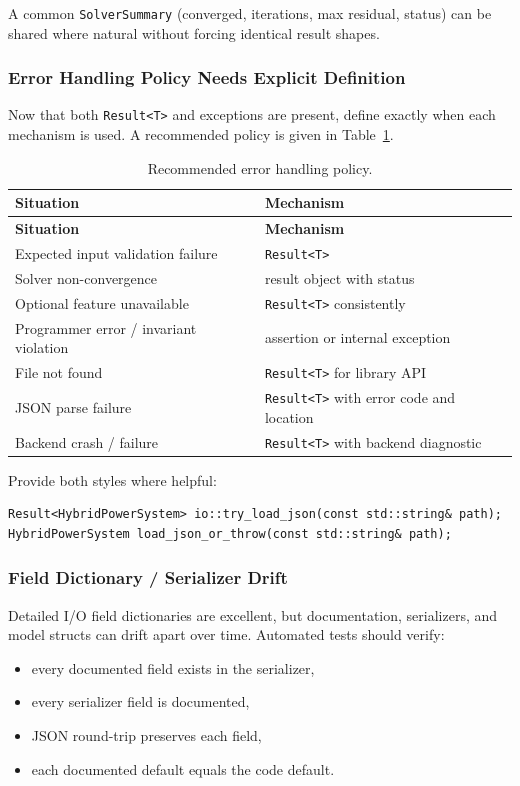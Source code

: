 A common \texttt{SolverSummary} (converged, iterations, max residual, status)
can be shared where natural without forcing identical result shapes.

\subsubsection{Error Handling Policy Needs Explicit Definition}

Now that both \texttt{Result<T>} and exceptions are present, define exactly
when each mechanism is used.  A recommended policy is given in
Table~\ref{tab:error-policy}.

\begin{longtable}{ll}
\caption{Recommended error handling policy.\label{tab:error-policy}} \\
\hline\hline
\textbf{Situation} & \textbf{Mechanism} \\
\hline\endfirsthead\hline\hline\textbf{Situation}&\textbf{Mechanism}\\\hline\endhead\hline\endfoot
Expected input validation failure & \texttt{Result<T>} \\
Solver non-convergence & result object with status \\
Optional feature unavailable & \texttt{Result<T>} consistently \\
Programmer error / invariant violation & assertion or internal exception \\
File not found & \texttt{Result<T>} for library API \\
JSON parse failure & \texttt{Result<T>} with error code and location \\
Backend crash / failure & \texttt{Result<T>} with backend diagnostic \\
\end{longtable}

Provide both styles where helpful:
\begin{verbatim}
Result<HybridPowerSystem> io::try_load_json(const std::string& path);
HybridPowerSystem load_json_or_throw(const std::string& path);
\end{verbatim}

\subsubsection{Field Dictionary / Serializer Drift}

Detailed I/O field dictionaries are excellent, but documentation, serializers,
and model structs can drift apart over time.  Automated tests should verify:
\begin{itemize}
  \item every documented field exists in the serializer,
  \item every serializer field is documented,
  \item JSON round-trip preserves each field,
  \item each documented default equals the code default.
\end{itemize}

